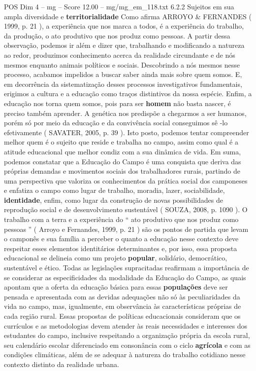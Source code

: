 \begin{textsample}{POS Dim 4 – mg – Score 12.00 – mg/mg\_em\_118.txt}  \label{ex:f4_pos_194}
6.2.2 Sujeitos em sua ampla diversidade e \textbf{territorialidade} Como afirma ARROYO \& FERNANDES ( 1999, p. 21 ), a experiência que nos marca a todos, é a experiência do trabalho, da produção, o ato produtivo que nos produz como pessoas.
A partir dessa observação, podemos ir além e dizer que, trabalhando e modificando a natureza ao redor, produzimos conhecimento acerca da realidade circundante e de nós mesmos enquanto animais políticos e sociais.
Descobrindo a nós mesmos nesse processo, acabamos impelidos a buscar saber ainda mais sobre quem somos.
E, em decorrência da sistematização desses processos investigativos fundamentais, erigimos a cultura e a educação como traços distintivos da nossa espécie.
Enfim, a educação nos torna quem somos, pois para ser \textbf{homem} não basta nascer, é preciso também aprender.
A genética nos predispõe a chegarmos a ser humanos, porém só por meio da educação e da convivência social conseguimos sê -lo efetivamente ( SAVATER, 2005, p. 39 ).
Isto posto, podemos tentar compreender melhor quem é o sujeito que reside e trabalha no campo, assim como qual é a atitude educacional que melhor condiz com a sua dinâmica de vida.
Em suma, podemos constatar que a Educação do Campo é uma conquista que deriva das próprias demandas e movimentos sociais dos trabalhadores rurais, partindo de uma perspectiva que valoriza os conhecimentos da prática social dos camponeses e enfatiza o campo como lugar de trabalho, moradia, lazer, sociabilidade, \textbf{identidade}, enfim, como lugar da construção de novas possibilidades de reprodução social e de desenvolvimento sustentável ( SOUZA, 2008, p. 1090 ).
O trabalho com a terra e a experiência do “ ato produtivo que nos produz como pessoas ” ( Arroyo e Fernandes, 1999, p. 21 ) são os pontos de partida que levam o camponês e sua família a perceber o quanto a educação nesse contexto deve respeitar esses elementos identitários determinantes e, por isso, essa proposta educacional se delineia como um projeto \textbf{popular}, solidário, democrático, sustentável e ético.
Todas as legislações supracitadas reafirmam a importância de se considerar as especificidades da modalidade da Educação do Campo, as quais apontam que a oferta da educação básica para essas \textbf{populações} deve ser pensada e apresentada com as devidas adequações não só às peculiaridades da vida no campo, mas, igualmente, em observância às características próprias de cada região rural.
Essas propostas de políticas educacionais consideram que os currículos e as metodologias devem atender às reais necessidades e interesses dos estudantes do campo, inclusive respeitando a organização própria da escola rural, seu calendário escolar diferenciado em consonância com o ciclo \textbf{agrícola} e com as condições climáticas, além de se adequar à natureza do trabalho cotidiano nesse contexto distinto da realidade urbana.

\end{textsample}
